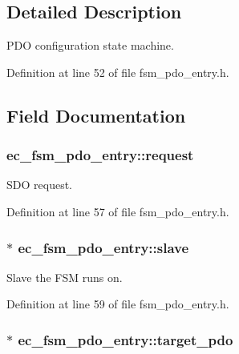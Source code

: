 \subsection{\-Detailed \-Description}
\-P\-D\-O configuration state machine. 

\-Definition at line 52 of file fsm\-\_\-pdo\-\_\-entry.\-h.



\subsection{\-Field \-Documentation}
\subsubsection[{request}]{ {\bf ec\-\_\-fsm\-\_\-pdo\-\_\-entry\-::request}}\label{structec__fsm__pdo__entry_ac0b43d5b10545d11bdb643455a3e8847}


\-S\-D\-O request. 



\-Definition at line 57 of file fsm\-\_\-pdo\-\_\-entry.\-h.

\subsubsection[{slave}]{$\ast$ {\bf ec\-\_\-fsm\-\_\-pdo\-\_\-entry\-::slave}}\label{structec__fsm__pdo__entry_a21123d79b0c9c5cde2c646a23c2ebbf6}


\-Slave the \-F\-S\-M runs on. 



\-Definition at line 59 of file fsm\-\_\-pdo\-\_\-entry.\-h.

\subsubsection[{target\-\_\-pdo}]{$\ast$ {\bf ec\-\_\-fsm\-\_\-pdo\-\_\-entry\-::target\-\_\-pdo}}\label{structec__fsm__pdo__entry_a3692d0c265514bf9d0723715786d2ca6}


